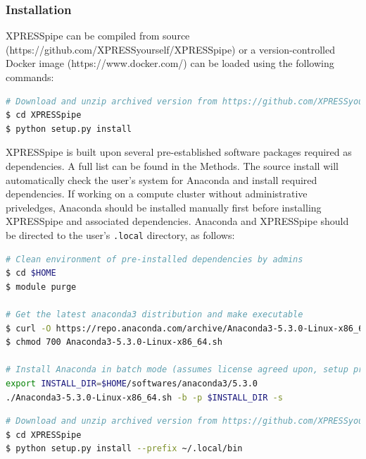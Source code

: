 \documentclass[11pt, a4paper, oneside]{article}
\begin{document}
\newline

\subsubsection{Installation}
XPRESSpipe can be compiled from source (https://github.com/XPRESSyourself/XPRESSpipe) or a version-controlled Docker image (https://www.docker.com/) can be loaded using the following commands:
\newline

\begin{lstlisting}[language=bash, caption=Source installation.]
# Download and unzip archived version from https://github.com/XPRESSyourself/XPRESSpipe/releases
$ cd XPRESSpipe
$ python setup.py install
\end{lstlisting}

XPRESSpipe is built upon several pre-established software packages required as dependencies. A full list can be found in the Methods. The source install will automatically check the user's system for Anaconda\cite{anaconda} and install required dependencies. If working on a compute cluster without administrative priveledges, Anaconda should be installed manually first before installing XPRESSpipe and associated dependencies. Anaconda and XPRESSpipe should be directed to the user's \texttt{.local} directory, as follows:

\begin{lstlisting}[language=bash, caption=Anaconda installation on compute node.]
# Clean environment of pre-installed dependencies by admins
$ cd $HOME
$ module purge

# Get the latest anaconda3 distribution and make executable
$ curl -O https://repo.anaconda.com/archive/Anaconda3-5.3.0-Linux-x86_64.sh
$ chmod 700 Anaconda3-5.3.0-Linux-x86_64.sh

# Install Anaconda in batch mode (assumes license agreed upon, setup prefix directory, and skip pre- and post- install scripts)
export INSTALL_DIR=$HOME/softwares/anaconda3/5.3.0
./Anaconda3-5.3.0-Linux-x86_64.sh -b -p $INSTALL_DIR -s
\end{lstlisting}


\begin{lstlisting}[language=bash, caption=Source installation on compute node.]
# Download and unzip archived version from https://github.com/XPRESSyourself/XPRESSpipe/releases
$ cd XPRESSpipe
$ python setup.py install --prefix ~/.local/bin
\end{lstlisting}
\end{document}
